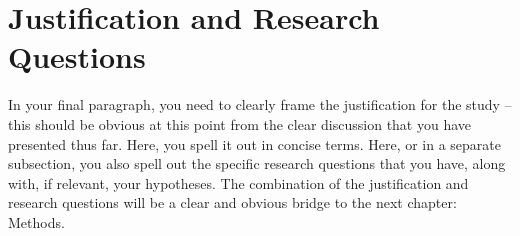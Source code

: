 \section{\label{sec:intro_res_quest}Justification and Research Questions}

In your final paragraph, you need to clearly frame the justification for the study -- this should be obvious at this point from the clear discussion that you have presented thus far. Here, you spell it out in concise terms. Here, or in a separate subsection, you also spell out the specific research questions that you have, along with, if relevant, your hypotheses. The combination of the justification and research questions will be a clear and obvious bridge to the next chapter: Methods.
